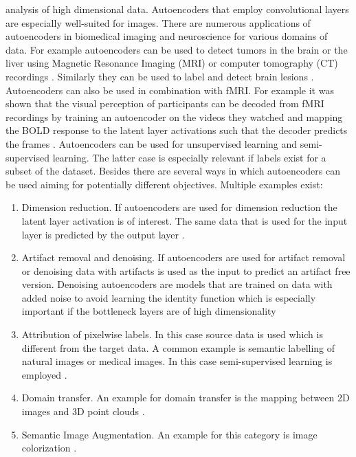 analysis of high dimensional data. Autoencoders that employ convolutional layers are especially well-suited for images. There are numerous applications of autoencoders in biomedical imaging and neuroscience for various domains of data. For example autoencoders can be used to detect tumors in the brain or the liver using Magnetic Resonance Imaging (MRI) or computer tomography (CT) recordings \parencite{mallick2019brain, sital20203d}. Similarly
they can be used to label and detect brain lesions \parencite{alex2017semisupervised}. Autoencoders can also be used in combination with fMRI. For example it was shown that the visual perception of participants can be decoded from fMRI recordings by training an autoencoder on the videos they watched and mapping
the BOLD response to the latent layer activations such that the decoder predicts the frames \parencite{han2019variational}. Autoencoders can be used for unsupervised learning and semi-supervised learning. The latter case is especially relevant if labels exist for a subset of the dataset. Besides there are several
ways in which autoencoders can be used aiming for potentially different objectives. Multiple examples exist:\\
\begin{enumerate}[label={(\arabic*)}]
    \item Dimension reduction. If autoencoders are used for dimension reduction the latent layer activation is of interest. The same data that is used for the input layer is predicted by the output layer \parencite{han2019variational}.
    \item Artifact removal and denoising. If autoencoders are used for artifact removal or denoising data with artifacts is used as the input to predict an artifact free version. Denoising autoencoders are models that are trained on data with added noise to avoid learning the identity function which is especially important if the bottleneck layers are of high dimensionality \parencite{paperswithcode2021denoising}
    \item Attribution of pixelwise labels. In this case source data is used which is different from the target data. A common example is semantic labelling of natural images or medical images. In this case semi-supervised learning is employed \parencite{alex2017semisupervised}.
    \item Domain transfer. An example for domain transfer is the mapping between 2D images and 3D point clouds \parencite{lin2018learning}.
    \item Semantic Image Augmentation. An example for this category is image colorization \parencite{anwar2020image}.
\end{enumerate}
